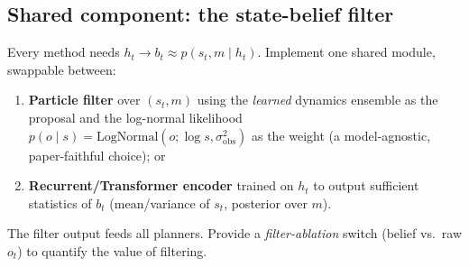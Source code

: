 \documentclass[11pt]{article}
\newcommand{\sobs}{\sigma_{\mathrm{obs}}}
\begin{document}
\subsection{Shared component: the state-belief filter}
\label{sec:filter}
Every method needs $h_t\!\to\! b_t\approx p(s_t,m\mid h_t)$. Implement one shared
module, swappable between:
\begin{enumerate}[nosep,leftmargin=1.6em]
\item \textbf{Particle filter} over $(s_t,m)$ using the \emph{learned} dynamics
ensemble as the proposal and the log-normal likelihood
$p(o\mid s)=\mathrm{LogNormal}(o; \log s,\sobs^2)$ as the weight (a model-agnostic,
paper-faithful choice); or
\item \textbf{Recurrent/Transformer encoder} trained on $h_t$ to output sufficient
statistics of $b_t$ (mean/variance of $s_t$, posterior over $m$).
\end{enumerate}
The filter output feeds all planners. Provide a \emph{filter-ablation} switch
(belief vs.\ raw $o_t$) to quantify the value of filtering.
\end{document}
